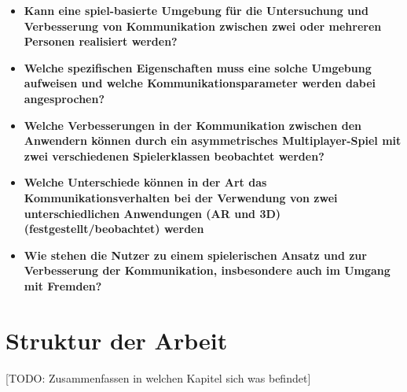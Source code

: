 \begin{itemize}
    \item \textbf{Kann eine spiel-basierte Umgebung für die Untersuchung und Verbesserung von Kommunikation zwischen zwei oder mehreren Personen realisiert werden?}
    \item \textbf{Welche spezifischen Eigenschaften muss eine solche Umgebung aufweisen und welche Kommunikationsparameter werden dabei angesprochen?}
    \item \textbf{Welche Verbesserungen in der Kommunikation zwischen den Anwendern können durch ein asymmetrisches Multiplayer-Spiel mit zwei verschiedenen Spielerklassen beobachtet werden?}
    \item \textbf{Welche Unterschiede können in der Art das Kommunikationsverhalten bei der Verwendung von zwei unterschiedlichen Anwendungen (AR und 3D) (festgestellt/beobachtet) werden}
    \item \textbf{Wie stehen die Nutzer zu einem spielerischen Ansatz und zur Verbesserung der Kommunikation, insbesondere auch im Umgang mit Fremden?}
\end{itemize}

\section{Struktur der Arbeit}

[TODO: Zusammenfassen in welchen Kapitel sich was befindet]